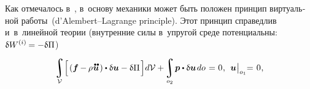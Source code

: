 \begin{otherlanguage}{russian}
Как отмечалось в~, в~основу механики может быть положен принцип виртуальной работы~(\hbox{d’\hspace{-0.2ex}Alembert--Lagrange} principle). Этот принцип справедлив и~в~линейной теории (внутренние силы в~упругой среде потенциальны: ${\variation{\internalwork} = -\variation{\Pi}}$)

\nopagebreak\vspace{-0.2em}\begin{equation}\label{lineartheory:principleofvirtualwork}
\integral\displaylimits_{\mathcal{V}} \hspace{-0.4ex} \left[^{\mathstrut} \hspace{-0.2ex} \left( \bm{f} \hspace{-0.1ex} - \hspace{-0.1ex} \rho \hspace{0.1ex} \mathdotdotabove{\bm{u}} \hspace{0.2ex} \right) \dotp \variation{\bm{u}} - \variation{\Pi} \hspace{0.25ex} \right] \hspace{-0.32ex} d\mathcal{V} + \hspace{-0.2ex}
\integral\displaylimits_{o_2} \hspace{-0.25ex} \bm{p} \dotp \variation{\bm{u}} \hspace{0.25ex} do \hspace{0.2ex} = \hspace{0.1ex} 0 \hspace{0.1ex}, \:\: \bm{u} \hspace{0.1ex} \bigr|_{o_1} \hspace{-0.64ex} = \hspace{0.2ex} 0 \hspace{0.1ex},
\end{equation}


\end{otherlanguage}

